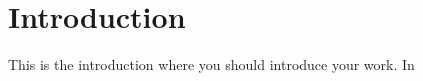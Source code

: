 \documentclass[a4paper,12pt,twoside,openright]{report}
\begin{document}
\pagestyle{empty}
\singlespacing

\onehalfspacing

\singlespacing


\setcounter{page}{0}
\pagestyle{plain}
\tableofcontents
\listoffigures
\listoftables

\onehalfspacing


\chapter{Introduction}
\setcounter{page}{1} 

This is the introduction where you should introduce your work.  In



\appendix
\singlespacing

 
% 
\end{document}
